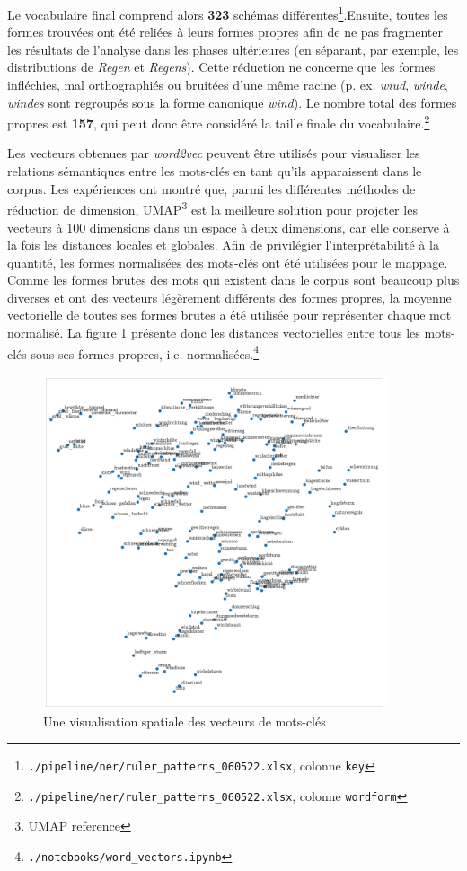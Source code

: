 \documentclass[a4paper,twoside,12pt]{article}
\begin{document}
Le vocabulaire final comprend alors \textbf{323} schémas différentes\footnote{\texttt{./pipeline/ner/ruler\_patterns\_060522.xlsx}, colonne \texttt{key}}.Ensuite, toutes les formes trouvées ont été reliées à leurs formes propres afin de ne pas fragmenter les résultats de l'analyse dans les phases ultérieures (en séparant, par exemple, les distributions de \textit{Regen} et \textit{Regens}). Cette réduction ne concerne que les formes infléchies, mal orthographiés ou bruitées d'une même racine (p. ex. \textit{wiud}, \textit{winde}, \textit{windes} sont regroupés sous la forme \og canonique \fg{} \textit{wind}). Le nombre total des formes propres est \textbf{157}, qui peut donc être considéré la taille finale du vocabulaire.\footnote{\texttt{./pipeline/ner/ruler\_patterns\_060522.xlsx}, colonne \texttt{wordform}}

Les vecteurs obtenues par \textit{word2vec} peuvent être utilisés pour visualiser les relations sémantiques entre les mots-clés en tant qu'ils apparaissent dans le corpus. Les expériences ont montré que, parmi les différentes méthodes de réduction de dimension, UMAP\footnote{UMAP reference} est la meilleure solution pour projeter les vecteurs à 100 dimensions dans un espace à deux dimensions, car elle conserve à la fois les distances locales et globales. Afin de privilégier l'interprétabilité à la quantité, les formes normalisées des mots-clés ont été utilisées pour le mappage. Comme les formes brutes des mots qui existent dans le corpus sont beaucoup plus diverses et ont des vecteurs légèrement différents des formes propres, la moyenne vectorielle de toutes ses formes brutes a été utilisée pour représenter chaque mot normalisé. La figure \ref{fig:keyword_umap} présente donc les distances vectorielles entre tous les mots-clés sous ses formes propres, i.e. normalisées.\footnote{\texttt{./notebooks/word\_vectors.ipynb}}

\begin{figure}[h]
    \centering
    \includegraphics[width=0.9\textwidth]{images/keyword_umap.pdf}
    \caption{Une visualisation spatiale des vecteurs de mots-clés}
    \label{fig:keyword_umap}
\end{figure}
\end{document}
